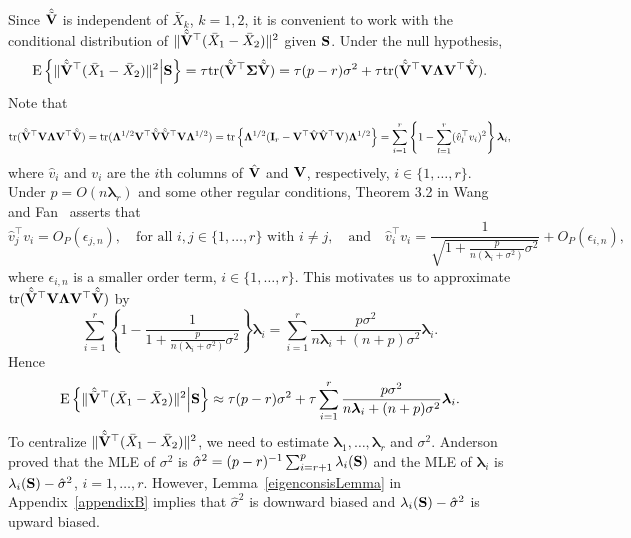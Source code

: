 \documentclass[times,sort&compress,3p]{elsarticle}
\newcommand{\mytr}{ {\rm tr} }
\newcommand{\myE}{ {\rm E} }
\newcommand{\bfsym}[1]{\ensuremath{\boldsymbol{#1}}}
\def\blambda {\bfsym {\lambda}}        \def\bLambda {\bfsym {\Lambda}}
\theoremstyle{plain}
\theoremstyle{definition}
\theoremstyle{remark}
\begin{document}
Since $\hat{\tilde{\mathbf{V}}}$ is independent of $\bar{X}_k$, $k=1,2$, it is convenient to work with the conditional distribution of $\|\hat{\tilde{\mathbf{V}}}^\top  (\bar{X}_1-\bar{X}_2)\|^2$ given $\mathbf{S}$. 
Under the null hypothesis, 
\begin{equation*}
    \myE \left\{ \|\hat{\tilde{\BV}}^\top  (\bar{X}_1-\bar{X}_2)\|^2 \Big|\BS \right\}
        =
\tau \mytr(\hat{\tilde{\BV}}^\top \bSigma\hat{\tilde{\BV}})
        =
\tau (p-r) \sigma^2+
\tau \mytr(\hat{\tilde{\BV}}^\top \BV \bLambda \BV^\top \hat{\tilde{\BV}}).
\end{equation*}
Note that
\begin{equation*}
    \mytr(\hat{\tilde{\BV}}^\top \BV \bLambda \BV^\top \hat{\tilde{\BV}})
=
\mytr( \bLambda^{1/2} \BV^\top \hat{\tilde{\BV}}\hat{\tilde{\BV}}^\top \BV \bLambda^{1/2} )
=
\mytr\left\{ \bLambda^{1/2} (\BI_r-\BV^\top \hat{\BV}\hat{\BV}^\top \BV) \bLambda^{1/2} \right\}
    =
    \sum_{i=1}^r  \left\{1-\sum_{l=1}^r (\hat{v}_l^\top  v_i)^2 \right\} \blambda_i,
\end{equation*}
where $\hat{v}_i$ and $v_i$ are the $i$th columns of $\hat{\mathbf{V}}$ and $\mathbf{V}$, respectively, $i\in \{1,\ldots, r\}$.
Under $p=O(n\blambda_r)$ and some other regular conditions, Theorem 3.2 in Wang and Fan~\cite{Fan2015Asymptotics} asserts that 
\begin{equation}\label{yaofengla1}
    \hat{v}_j^\top  v_i=O_P(\epsilon_{j,n}),\quad \text{for all $i,j\in\{1,\ldots, r\}$ with $i\neq j$},
\quad \text{and}\quad
\hat{v}_i^\top  v_i=\frac{1}{\sqrt{1+ \frac{p}{n(\blambda_i+\sigma^2)}\sigma^2}}+O_P(\epsilon_{i,n}),
\end{equation}
where $\epsilon_{i,n}$ is a smaller order term, $i\in \{1,\ldots, r\}$.
This motivates us to approximate $\mytr(\hat{\tilde{\BV}}^\top \BV \bLambda \BV^\top \hat{\tilde{\BV}})$
by
$$
\sum_{i=1}^r \left\{ 1-\frac{1}{1+\frac{p}{n(\blambda_i+\sigma^2)}\sigma^2}\right\} \blambda_i
=
\sum_{i=1}^r \frac{p\sigma^2}{n\blambda_i+(n+p)\sigma^2}\blambda_i.
$$
Hence 
$$
\myE \left\{ \|\hat{\tilde{\BV}}^\top  (\bar{X}_1-\bar{X}_2)\|^2 \Big|\BS \right\}
\approx
\tau(p-r)\sigma^2 + \tau\sum_{i=1}^r \frac{p\sigma^2}{n\blambda_i+(n+p)\sigma^2}\blambda_i.
$$
To centralize $\|\hat{\tilde{\mathbf{V}}}^\top  (\bar{X}_1-\bar{X}_2)\|^2$, we need to estimate $\blambda_1,\ldots, \blambda_r$ and $\sigma^2$.
Anderson~\cite{Anderson1986Asymptotic} proved that the MLE of $\sigma^2$ is $\hat{\sigma}^2=(p-r)^{-1}\sum_{i=r+1}^p \lambda_i(\mathbf{S})$ and the MLE of $\blambda_i$ is $\lambda_i(\mathbf{S})-\hat{\sigma}^2$, $i=1,\ldots, r$.
However, Lemma~\ref{eigenconsisLemma} in Appendix~\ref{appendixB} implies that $\hat{\sigma}^2$ is downward biased and $\lambda_i(\mathbf{S})-\hat{\sigma}^2$ is upward biased.
\end{document}
